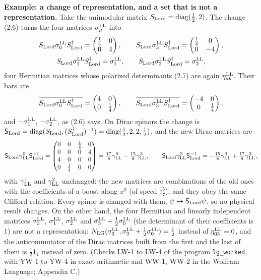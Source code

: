 \documentclass[
  10pt,
]{article}
\begin{document}
\textbf{Example: a change of representation, and a set that is not a
representation.} Take the unimodular matrix
\(S_{\rm Lord}=\mathrm{diag}(\tfrac12,2)\). The change (2.6) turns the
four matrices \(\sigma^{\rm LL}_\mu\) into
\[\begin{gathered}S_{\rm Lord}\sigma^{\rm LL}_0S_{\rm Lord}^\dagger=\begin{pmatrix}\tfrac{1}{4}&0\\0&4\end{pmatrix},\qquad S_{\rm Lord}\sigma^{\rm LL}_3S_{\rm Lord}^\dagger=\begin{pmatrix}\tfrac{1}{4}&0\\0&-4\end{pmatrix},\\S_{\rm Lord}\sigma^{\rm LL}_1S_{\rm Lord}^\dagger=\sigma^{\rm LL}_1,\qquad S_{\rm Lord}\sigma^{\rm LL}_2S_{\rm Lord}^\dagger=\sigma^{\rm LL}_2,\end{gathered}\]
four Hermitian matrices whose polarized determinants (2.7) are again
\(\eta^{\rm LL}_{ab}\). Their bars are
\[\overline{S_{\rm Lord}\sigma^{\rm LL}_0S_{\rm Lord}^\dagger}=\begin{pmatrix}4&0\\0&\tfrac{1}{4}\end{pmatrix},\qquad\overline{S_{\rm Lord}\sigma^{\rm LL}_3S_{\rm Lord}^\dagger}=\begin{pmatrix}-4&0\\0&\tfrac{1}{4}\end{pmatrix},\]
and \(-\sigma^{\rm LL}_1\), \(-\sigma^{\rm LL}_2\), as (2.6) says. On
Dirac spinors the change is
\(\mathsf S_{\rm Lord}=\mathrm{diag}(S_{\rm Lord},(S_{\rm Lord}^\dagger)^{-1})=\mathrm{diag}(\tfrac12,2,2,\tfrac12)\),
and the new Dirac matrices are
\[\mathsf S_{\rm Lord}\gamma^0_{\rm LL}\mathsf S_{\rm Lord}^{-1}=\begin{pmatrix}0&0&\tfrac{1}{4}&0\\0&0&0&4\\4&0&0&0\\0&\tfrac{1}{4}&0&0\end{pmatrix}=\tfrac{17}8\gamma^0_{\rm LL}-\tfrac{15}8\gamma^3_{\rm LL},\qquad\mathsf S_{\rm Lord}\gamma^3_{\rm LL}\mathsf S_{\rm Lord}^{-1}=-\tfrac{15}8\gamma^0_{\rm LL}+\tfrac{17}8\gamma^3_{\rm LL},\]
with \(\gamma^1_{\rm LL}\) and \(\gamma^2_{\rm LL}\) unchanged: the new
matrices are combinations of the old ones with the coefficients of a
boost along \(x^3\) (of speed \(\tfrac{15}{17}\)), and they obey the
same Clifford relation. Every spinor is changed with them,
\(\psi\mapsto\mathsf S_{\rm Lord}\psi\), so no physical result changes.
On the other hand, the four Hermitian and linearly independent matrices
\(\sigma^{\rm LL}_0\), \(\sigma^{\rm LL}_1\), \(\sigma^{\rm LL}_2\) and
\(\sigma^{\rm LL}_3+\tfrac12\sigma^{\rm LL}_0\) (the determinant of
their coefficients is \(1\)) are not a representation:
\(N_{\rm LG}(\sigma^{\rm LL}_0,\sigma^{\rm LL}_3+\tfrac12\sigma^{\rm LL}_0)=\tfrac{1}{2}\)
instead of \(\eta^{\rm LL}_{03}=0\), and the anticommutator of the Dirac
matrices built from the first and the last of them is
\(\tfrac12\mathsf 1_4\) instead of zero. (Checks LW-1 to LW-4 of the
program \texttt{lg\_worked}, with YW-1 to YW-4 in exact arithmetic and
WW-1, WW-2 in the Wolfram Language; Appendix C.)
\end{document}
